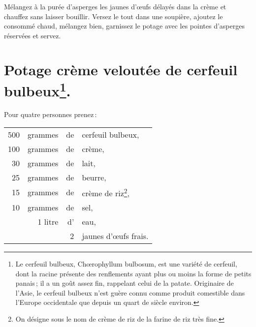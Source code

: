 Mélangez à la purée d'asperges les jaunes d'œufs délayés dans la crème et chauffez
sans laisser bouillir. Versez le tout dans une soupière, ajoutez le consommé chaud,
mélangez bien, garnissez le potage avec les pointes d'asperges réservées et servez.

\section*{\centering Potage crème veloutée de cerfeuil bulbeux\footnote{
                                  Le cerfeuil bulbeux, Chœrophyllum bulbosum, est 
                                  une variété de cerfeuil, dont la racine présente 
                                  des renflements ayant plus ou moins la forme de petits 
                                  panais ; il a un goût assez fin, rappelant celui 
                                  de la patate. Originaire de l'Asie, le cerfeuil 
                                  bulbeux n'est guère connu comme produit comestible 
                                  dans l'Europe occidentale que depuis un quart de 
                                  siècle environ.}.}

Pour quatre personnes prenez :

\medskip

\footnotesize
\begin{longtable}{rrrp{16em}}                                                    
    500 & grammes & de & cerfeuil bulbeux,                                                               \\
    100 & grammes & de & crème,                                                                          \\
     30 & grammes & de & lait,                                                                           \\
     25 & grammes & de & beurre,                                                                         \\
     15 & grammes & de & crème de riz\footnote{On désigne sous le nom de crème de riz de la      
                                              farine de riz très fine.},                                 \\
     10 & grammes & de & sel,                                                                            \\
        & 1 litre & d' & eau,                                                                            \\
        &         &  2 & jaunes d'œufs frais.                                                            \\
\end{longtable}
\normalsize
                                            

